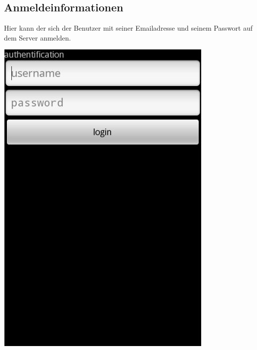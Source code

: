 \documentclass[a4paper,10pt,titlepage]{article}
\begin{document}
\subsection{Anmeldeinformationen}
Hier kann der sich der Benutzer mit seiner Emailadresse und  seinem Passwort auf dem Server anmelden.
\begin {center}
\includegraphics[scale=0.35]{media/android/login.jpg}
\end {center}
\end{document}
